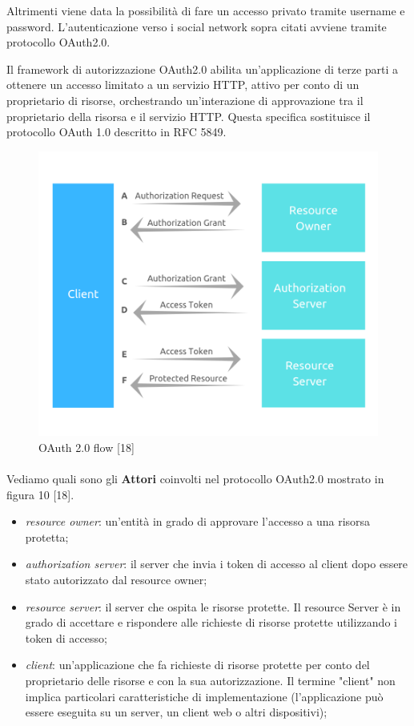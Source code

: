 Altrimenti viene data la possibilità di fare un accesso privato tramite username e password.
L'autenticazione verso i social network sopra citati avviene tramite protocollo OAuth2.0.

Il framework di autorizzazione OAuth2.0 abilita un'applicazione di terze parti a ottenere un accesso limitato a un servizio HTTP, attivo
per conto di un proprietario di risorse, orchestrando un'interazione di approvazione tra il proprietario della risorsa e il servizio HTTP.
Questa specifica sostituisce il protocollo OAuth 1.0 descritto in RFC 5849.

\begin{figure}[h!]
    \centering  
    \caption{OAuth 2.0 flow [18]}
    \includegraphics[scale=0.60]{img/cap2/oauth20-2}
\end{figure}

\paragraph{}

Vediamo quali sono gli \textbf{Attori} coinvolti nel protocollo OAuth2.0 mostrato in figura 10 [18].

\begin{itemize}
\item \textit{resource owner}: un'entità in grado di approvare l'accesso a una risorsa protetta;
\item \textit{authorization server}: il server che invia i token di accesso al client dopo essere stato autorizzato
dal resource owner;
\item \textit{resource server}: il server che ospita le risorse protette. Il resource Server è in grado di accettare
e rispondere alle richieste di risorse protette utilizzando i token di accesso;
\item \textit{client}: un'applicazione che fa richieste di risorse protette per conto del
proprietario delle risorse e con la sua autorizzazione. Il termine "client"
non implica particolari caratteristiche di implementazione (l'applicazione può essere eseguita
su un server, un client web o altri dispositivi);
\end{itemize}


